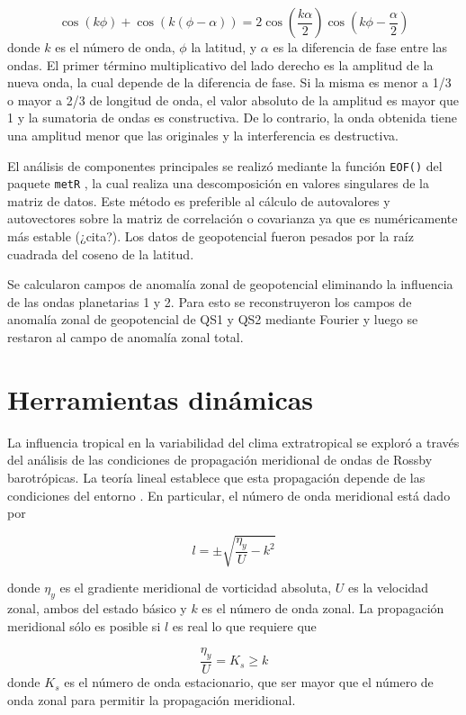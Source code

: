 \documentclass[spanish,a4paper,12pt,oneside]{book}
\begin{document}
\[
\cos\left (k\phi \right) + \cos(k(\phi - \alpha)) = 2\cos\left( \frac{k\alpha}{2} \right)\cos\left( k\phi - \frac{\alpha}{2}\right) 
\] donde \(k\) es el número de onda, \(\phi\) la latitud, y \(\alpha\)
es la diferencia de fase entre las ondas. El primer término
multiplicativo del lado derecho es la amplitud de la nueva onda, la cual
depende de la diferencia de fase. Si la misma es menor a 1/3 o mayor a
2/3 de longitud de onda, el valor absoluto de la amplitud es mayor que 1
y la sumatoria de ondas es constructiva. De lo contrario, la onda
obtenida tiene una amplitud menor que las originales y la interferencia
es destructiva.

El análisis de componentes principales se realizó mediante la función
\texttt{EOF()} del paquete \texttt{metR} \citep{R-metR}, la cual realiza
una descomposición en valores singulares de la matriz de datos. Este
método es preferible al cálculo de autovalores y autovectores sobre la
matriz de correlación o covarianza ya que es numéricamente más estable
(¿cita?). Los datos de geopotencial fueron pesados por la raíz cuadrada
del coseno de la latitud.

Se calcularon campos de anomalía zonal de geopotencial eliminando la
influencia de las ondas planetarias 1 y 2. Para esto se reconstruyeron
los campos de anomalía zonal de geopotencial de QS1 y QS2 mediante
Fourier y luego se restaron al campo de anomalía zonal total.

\section*{Herramientas dinámicas}

La influencia tropical en la variabilidad del clima extratropical se
exploró a través del análisis de las condiciones de propagación
meridional de ondas de Rossby barotrópicas. La teoría lineal establece
que esta propagación depende de las condiciones del entorno
\citep{James}. En particular, el número de onda meridional está dado por

\[
l = \pm \sqrt{\frac{\eta_{y}}{U} - k^2}
\]

donde \(\eta_{y}\) es el gradiente meridional de vorticidad absoluta,
\(U\) es la velocidad zonal, ambos del estado básico y \(k\) es el
número de onda zonal. La propagación meridional sólo es posible si \(l\)
es real lo que requiere que

\[
\frac{\eta_{y}}{U} = K_s \ge k 
\] donde \(K_s\) es el número de onda estacionario, que ser mayor que el
número de onda zonal para permitir la propagación meridional.
\end{document}

